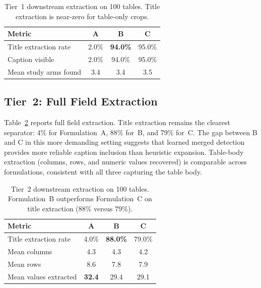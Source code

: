 \documentclass[pdflatex,sn-mathphys-num,iicol]{sn-jnl}
\begin{document}
\begin{table}[ht!]
\caption{Tier~1 downstream extraction on 100 tables. Title extraction is near-zero for
table-only crops.}
\label{tab:downstream_t1}
\footnotesize\setlength{\tabcolsep}{3pt}
\begin{tabular}{@{}lccc@{}}
\toprule
\textbf{Metric} & \textbf{A} & \textbf{B} & \textbf{C} \\
\midrule
Title extraction rate & 2.0\% & \textbf{94.0\%} & 95.0\% \\
Caption visible & 2.0\% & 94.0\% & 95.0\% \\
Mean study arms found & 3.4 & 3.4 & 3.5 \\
\bottomrule
\end{tabular}
\end{table}

\subsection{Tier~2: Full Field Extraction}\label{sec:tier2}

Table~\ref{tab:downstream_t2} reports full field extraction. Title extraction remains
the clearest separator: 4\% for Formulation~A, 88\% for~B, and 79\% for~C. The gap
between B and C in this more demanding setting suggests that learned merged detection
provides more reliable caption inclusion than heuristic expansion. Table-body
extraction (columns, rows, and numeric values recovered) is comparable across
formulations, consistent with all three capturing the table body.

\begin{table}[ht!]
\caption{Tier~2 downstream extraction on 100 tables. Formulation~B outperforms
Formulation~C on title extraction (88\% versus 79\%).}
\label{tab:downstream_t2}
\footnotesize\setlength{\tabcolsep}{3pt}
\begin{tabular}{@{}lccc@{}}
\toprule
\textbf{Metric} & \textbf{A} & \textbf{B} & \textbf{C} \\
\midrule
Title extraction rate & 4.0\% & \textbf{88.0\%} & 79.0\% \\
Mean columns & 4.3 & 4.3 & 4.2 \\
Mean rows & 8.6 & 7.8 & 7.9 \\
Mean values extracted & \textbf{32.4} & 29.4 & 29.1 \\
\bottomrule
\end{tabular}
\end{table}

\end{document}
